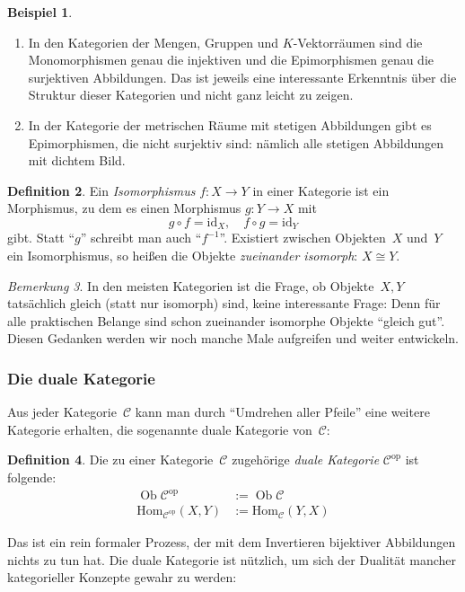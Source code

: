 \documentclass[a4paper,ngerman]{scrartcl}
\theoremstyle{definition}
\newtheorem{defn}{Definition}[section]
\newtheorem{bsp}[defn]{Beispiel}
\theoremstyle{plain}
\theoremstyle{remark}
\newtheorem{bem}[defn]{Bemerkung}
\newcommand{\C}{\mathcal{C}}
\newcommand{\Hom}{\mathrm{Hom}}
\newcommand{\id}{\mathrm{id}}
\DeclareMathOperator{\Ob}{Ob}
\newcommand{\op}{\mathrm{op}}
\begin{document}
\begin{bsp}\begin{enumerate}
\item In den Kategorien der Mengen, Gruppen und $K$-Vektorräumen sind die
Monomorphismen genau die injektiven und die Epimorphismen genau die
surjektiven Abbildungen. Das ist jeweils eine interessante Erkenntnis über die
Struktur dieser Kategorien und nicht ganz leicht zu zeigen.
\item In der Kategorie der metrischen Räume mit stetigen Abbildungen gibt es
Epimorphismen, die nicht surjektiv sind: nämlich alle stetigen Abbildungen mit
dichtem Bild.
\end{enumerate}\end{bsp}

\begin{defn}
Ein \emph{Isomorphismus} $f:X \to Y$ in einer Kategorie ist ein
Morphismus, zu dem es einen Morphismus $g:Y \to X$ mit
\[ g \circ f = \id_X, \quad f \circ g = \id_Y \]
gibt. Statt "`$g$"' schreibt man auch "`$f^{-1}$"'. Existiert zwischen
Objekten~$X$ und~$Y$ ein Isomorphismus, so heißen die Objekte \emph{zueinander
isomorph}:
$X \cong Y$.
\end{defn}

\begin{bem}\label{gleichheitobj}In den meisten Kategorien ist die Frage, ob
Objekte~$X,Y$ tatsächlich gleich (statt nur isomorph) sind, keine interessante
Frage: Denn für alle praktischen Belange sind schon zueinander isomorphe
Objekte "`gleich gut"'. Diesen Gedanken werden wir noch manche Male aufgreifen
und weiter entwickeln.\end{bem}


\subsubsection*{Die duale Kategorie}

Aus jeder Kategorie~$\C$ kann man durch "`Umdrehen aller Pfeile"' eine weitere
Kategorie erhalten, die sogenannte duale Kategorie von~$\C$:

\begin{defn}
Die zu einer Kategorie~$\C$ zugehörige \emph{duale Kategorie} $\C^\op$ ist
folgende:
\begin{align*}
  \Ob \C^\op &:= \Ob \C \\
  \Hom_{\C^\op}(X,Y) &:= \Hom_\C(Y,X)
\end{align*}
\end{defn}

Das ist ein rein formaler Prozess, der mit dem Invertieren bijektiver
Abbildungen nichts zu tun hat. Die duale Kategorie ist nützlich, um sich der
Dualität mancher kategorieller Konzepte gewahr zu werden:
\end{document}
